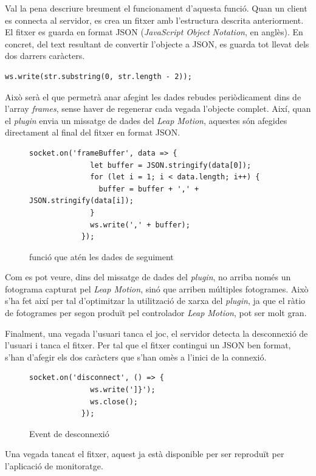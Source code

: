 \documentclass[12pt,a4paper,catalan]{article}
\begin{document}
	Val la pena descriure breument el funcionament d'aquesta funció.
	Quan un client es connecta al servidor, es crea un fitxer amb l'estructura descrita anteriorment. El fitxer es guarda en format JSON (\textit{JavaScript Object Notation}, en anglès). En concret, del text resultant de convertir l'objecte a JSON, es guarda tot llevat dels dos darrers caràcters.
	\begin{lstlisting}[gobble=8, tabsize=4]
		ws.write(str.substring(0, str.length - 2));
	\end{lstlisting}
	Això serà el que permetrà anar afegint les dades rebudes periòdicament dins de l'array \textit{frames}, sense haver de regenerar cada vegada l'objecte complet.
	Així, quan el \textit{plugin} envia un missatge de dades del \textit{Leap Motion}, aquestes són afegides directament al final del fitxer en format JSON.
	\begin{figure}[H]
		\begin{lstlisting}[gobble=12, tabsize=4]
			socket.on('frameBuffer', data => {
			  let buffer = JSON.stringify(data[0]);
			  for (let i = 1; i < data.length; i++) {
			    buffer = buffer + ',' + JSON.stringify(data[i]);
			  }
			  ws.write(',' + buffer);
			});
		\end{lstlisting}
		\caption{funció que atén les dades de seguiment}
		\label{fig:socket-frame-data}
	\end{figure}
	Com es pot veure, dins del missatge de dades del \textit{plugin}, no arriba només un fotograma capturat pel \textit{Leap Motion}, sinó que arriben múltiples fotogrames. Això s'ha fet així per tal d'optimitzar la utilització de xarxa del \textit{plugin}, ja que el ràtio de fotogrames per segon produït pel controlador \textit{Leap Motion}, pot ser molt gran.
	
	Finalment, una vegada l'usuari tanca el joc, el servidor detecta la desconnexió de l'usuari i tanca el fitxer. Per tal que el fitxer contingui un JSON ben format, s'han d'afegir els dos caràcters que s'han omès a l'inici de la connexió.
	\begin{figure}[H]
		\begin{lstlisting}[gobble=12, tabsize=4]
			socket.on('disconnect', () => {
			  ws.write(']}');
			  ws.close();
			});
		\end{lstlisting}
		\caption{Event de desconnexió}
		\label{fig:socket-disconnect}
	\end{figure}
	Una vegada tancat el fitxer, aquest ja està disponible per ser reproduït per l'aplicació de monitoratge.
\end{document}
